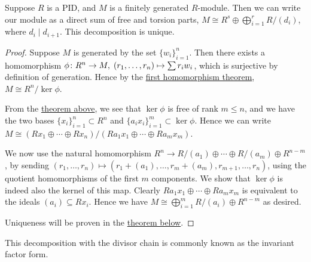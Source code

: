 \begin{theorem}\label{thm:structure-invariant}
    Suppose \(R\) is a PID,
    and \(M\) is a finitely generated \(R\)-module.
    Then we can write our module as a direct sum of free and torsion parts,
    \(M \cong R^s \oplus \bigoplus_{i=1}^r R/(d_i)\), where \(d_i \mid d_{i+1}\).
    This decomposition is unique.
\end{theorem}
\begin{proof}
    Suppose \(M\) is generated by the set \({\{w_i\}}_{i=1}^n\).
    Then there exists a homomorphism \(\phi\colon R^n\to M,\;(r_1,\hdots,r_n)\mapsto\sum r_i w_i\),
    which is surjective by definition of generation.
    Hence by the \hyperref[thm:iso-1-mod]{first homomorphism theorem},
    \(M \cong R^n/\ker\phi\).

    From the \hyperref[thm:pid-submodule-free]{theorem above},
    we see that \(\ker\phi\) is free of rank \(m \leq n\),
    and we have the two bases \({\{x_i\}}_{i=1}^n \subset R^n\)
    and \({\{a_i x_i\}}_{i=1}^m \subset \ker\phi\).
    Hence we can write \(M \cong (Rx_1 \oplus \cdots \oplus Rx_n)/(Ra_1x_1 \oplus \cdots \oplus Ra_mx_m)\).

    We now use the natural homomorphism \(R^n \to R/(a_1) \oplus \cdots \oplus R/(a_m) \oplus R^{n-m}\),
    by sending \((r_1,\hdots,r_n) \mapsto (r_1+(a_1),\hdots,r_m+(a_m),r_{m+1},\hdots,r_n)\),
    using the quotient homomorphisms of the first \(m\) components.
    We show that \(\ker\phi\) is indeed also the kernel of this map.
    Clearly \(Ra_1x_1 \oplus \cdots \oplus Ra_mx_m\)
    is equivalent to the ideals \((a_i) \subseteq Rx_i\).
    Hence we have \(M \cong \bigoplus_{i=1}^m R/(a_i) \oplus R^{n-m}\) as desired.

    Uniqueness will be proven in the \hyperref[thm:structure-divisor]{theorem below}.
\end{proof}
\begin{remark}
    This decomposition with the divisor chain is commonly known
    as the invariant factor form.
\end{remark}

